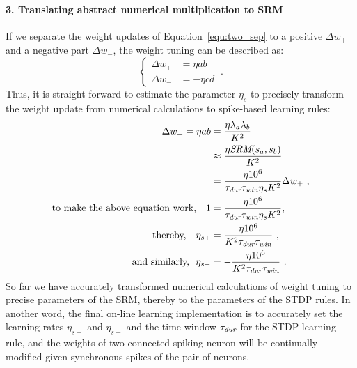 

\paragraph{3. Translating abstract numerical multiplication to SRM\\}
If we separate the weight updates of Equation~\ref{equ:two_sep} to a positive $\Delta w_+$ and a negative part $\Delta w_-$, the weight tuning can be described as:
\begin{equation}
\left\{
\begin{aligned} 
\Delta w_+ &= \eta ab\\
\Delta w_- &= -\eta cd
\end{aligned}
\right.~.
\end{equation}
Thus, it is straight forward to estimate the parameter $\eta_s$ to precisely transform the weight update from numerical calculations to spike-based learning rules:
\begin{equation}
\begin{aligned} 
\Delta w_+ = \eta ab &=\frac{\eta \lambda_a \lambda_b}{K^2}\\
&\approx \frac{\eta \textit{\textrm{SRM}}(s_a, s_b)}{K^2}\\ &=
\frac{\eta 10^6}{\tau_{\textit{\textrm{dur}}}
\tau_{\textit{\textrm{win}}}
\eta_s K^2}
\Delta w_+~,\\
\textrm{to make the above equation work,}~~\
1&=\frac{\eta 10^6}{\tau_{\textit{\textrm{dur}}}
\tau_{\textit{\textrm{win}}}
\eta_s K^2},~~\\
\textrm{thereby,~~}\
\eta_{s+} &=  \frac{\eta 10^6}{K^2 \tau_{\textit{\textrm{dur}}} \tau_{\textit{\textrm{win}}}}~,\\
\textrm{and similarly,~~}
\eta_{s-} &=  -\frac{\eta 10^6}{K^2 \tau_{\textit{\textrm{dur}}} \tau_{\textit{\textrm{win}}}}~.
\end{aligned}
\label{equ:srm}
\end{equation}
So far we have accurately transformed numerical calculations of weight tuning to precise parameters of the SRM, thereby to the parameters of the STDP rules.
In another word, the final on-line learning implementation is to accurately set the learning rates $\eta_{s+}$ and $\eta_{s-}$ and the time window $\tau_{\textit{\textrm{dur}}}$ for the STDP learning rule, and the weights of two connected spiking neuron will be continually modified given synchronous spikes of the pair of neurons. 

